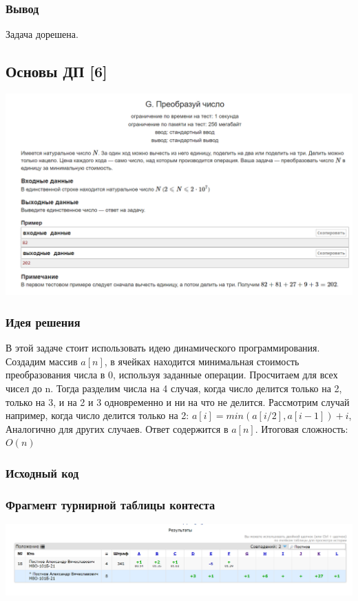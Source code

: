 \subsubsection*{Вывод}
Задача дорешена.

\vspace{20pt}

\pagebreak

\subsection*{Основы ДП [6]}
\begin{center}
\includegraphics[width=\textwidth]{statements/6.png}
\end{center}
\subsubsection*{Идея решения}
В этой задаче стоит использовать идею динамического программирования. Создадим массив $a[n]$, в ячейках находится минимальная стоимость преобразования числа в 0, используя заданные операции. Просчитаем для всех чисел до n. Тогда разделим числа на 4 случая, когда число делится только на 2, только на 3, и на 2 и 3 одновременно и ни на что не делится. Рассмотрим случай например, когда число делится только на 2:
$a[i] = min(a[i / 2], a[i - 1]) + i$,
Аналогично для других случаев.
Ответ содержится в $a[n]$.
Итоговая сложность: $O(n)$
\subsubsection*{Исходный код}


\subsubsection*{Фрагмент турнирной таблицы контеста}
\begin{center}
\includegraphics[width=\textwidth]{standings/6.png}\newline\noindent
\end{center}

